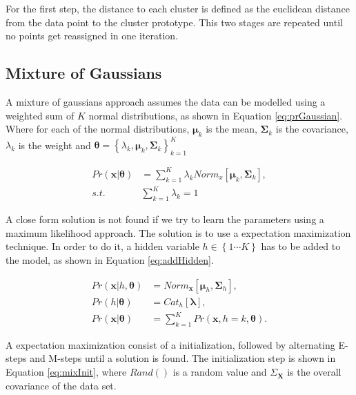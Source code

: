 \documentclass[12pt]{article}
\begin{document}
For the first step, the distance to each cluster is defined as the euclidean distance from the data point to the cluster prototype.
This two stages are repeated until no points get reassigned in one iteration.
 
\subsection{Mixture of Gaussians}

A mixture of gaussians approach assumes the data can be modelled using a weighted sum of $K$ normal distributions, as shown in Equation \ref{eq:prGaussian}.
Where for each of the normal distributions, $\boldsymbol{\mu}_k$ is the mean, $\mathbf{\Sigma}_k$ is the covariance, $\lambda_k$ is the weight and $\boldsymbol{\theta} = \left\{ \lambda_k, \boldsymbol{\mu}_k, \mathbf{\Sigma}_k \right\}_{k=1}^K $

\begin{equation}
\begin{split}
\label{eq:prGaussian}
Pr(\mathbf{x}|\boldsymbol{\theta}) &= \sum_{k=1}^K \lambda_k Norm_x \left[ \boldsymbol{\mu}_k, \mathbf{\Sigma}_k \right],\\
s.t. \qquad & \sum_{k = 1}^K \lambda_k = 1
\end{split}
\end{equation}

A close form solution is not found if we try to learn the parameters using a maximum likelihood approach.
The solution is to use a expectation maximization technique.
In order to do it, a hidden variable $h \in \left\{ 1 \cdots K \right\} $ has to be added to the model, as shown in Equation \ref{eq:addHidden}.

\begin{equation}
\begin{split}
\label{eq:addHidden}
Pr(\mathbf{x}| h, \boldsymbol{\theta} ) &= Norm_{\mathbf{x}} \left[ \boldsymbol{\mu}_h, \mathbf{\Sigma}_h \right],\\
Pr(h | \boldsymbol{\theta}) &= Cat_h \left[ \boldsymbol{\lambda} \right],\\
Pr(\mathbf{x}| \boldsymbol{\theta}) &= \sum_{k=1}^K Pr(\mathbf{x}, h = k, \boldsymbol{\theta}).
\end{split}
\end{equation}


A expectation maximization consist of a initialization, followed by alternating E-steps and M-steps until a solution is found.
The initialization step is shown in Equation \ref{eq:mixInit}, where $Rand()$ is a random value and $\Sigma_{\mathbf{X}}$ is the overall covariance of the data set.
\end{document}
